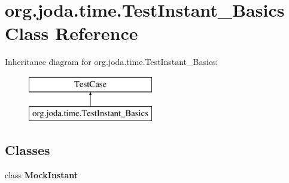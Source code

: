 \hypertarget{classorg_1_1joda_1_1time_1_1_test_instant___basics}{\section{org.\-joda.\-time.\-Test\-Instant\-\_\-\-Basics Class Reference}
\label{classorg_1_1joda_1_1time_1_1_test_instant___basics}
}
Inheritance diagram for org.\-joda.\-time.\-Test\-Instant\-\_\-\-Basics\-:\begin{figure}[H]
\begin{center}
\leavevmode
\includegraphics[height=2.000000cm]{classorg_1_1joda_1_1time_1_1_test_instant___basics}
\end{center}
\end{figure}
\subsection*{Classes}
\begin{DoxyCompactItemize}
\item 
class {\bfseries Mock\-Instant}
\end{DoxyCompactItemize}

